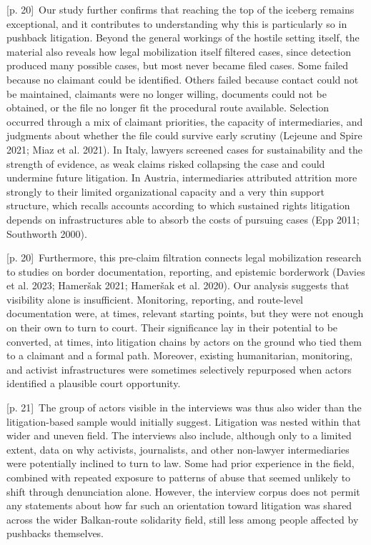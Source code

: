 \documentclass[10pt,a4paper]{article}
\begin{document}
{\scriptsize\color{gray} [p. 20]}\ Our study further confirms that reaching the top of the iceberg remains exceptional, and it contributes to understanding why this is particularly so in pushback litigation. Beyond the general workings of the hostile setting itself, the material also reveals how legal mobilization itself filtered cases, since detection produced many possible cases, but most never became filed cases. Some failed because no claimant could be identified. Others failed because contact could not be maintained, claimants were no longer willing, documents could not be obtained, or the file no longer fit the procedural route available. Selection occurred through a mix of claimant priorities, the capacity of intermediaries, and judgments about whether the file could survive early scrutiny (Lejeune and Spire 2021; Miaz et al. 2021). In Italy, lawyers screened cases for sustainability and the strength of evidence, as weak claims risked collapsing the case and could undermine future litigation. In Austria, intermediaries attributed attrition more strongly to their limited organizational capacity and a very thin support structure, which recalls accounts according to which sustained rights litigation depends on infrastructures able to absorb the costs of pursuing cases (Epp 2011; Southworth 2000).\par
{\scriptsize\color{gray} [p. 20]}\ Furthermore, this pre-claim filtration connects legal mobilization research to studies on border documentation, reporting, and epistemic borderwork (Davies et al. 2023; Hameršak 2021; Hameršak et al. 2020). Our analysis suggests that visibility alone is insufficient. Monitoring, reporting, and route-level documentation were, at times, relevant starting points, but they were not enough on their own to turn to court. Their significance lay in their potential to be converted, at times, into litigation chains by actors on the ground who tied them to a claimant and a formal path. Moreover, existing humanitarian, monitoring, and activist infrastructures were sometimes selectively repurposed when actors identified a plausible court opportunity.\par
{\scriptsize\color{gray} [p. 21]}\ The group of actors visible in the interviews was thus also wider than the litigation-based sample would initially suggest. Litigation was nested within that wider and uneven field. The interviews also include, although only to a limited extent, data on why activists, journalists, and other non-lawyer intermediaries were potentially inclined to turn to law. Some had prior experience in the field, combined with repeated exposure to patterns of abuse that seemed unlikely to shift through denunciation alone. However, the interview corpus does not permit any statements about how far such an orientation toward litigation was shared across the wider Balkan-route solidarity field, still less among people affected by pushbacks themselves.\par
\end{document}
